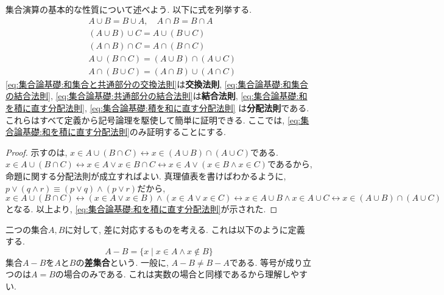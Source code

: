         集合演算の基本的な性質について述べよう. 以下に式を列挙する.
        \begin{align}
            &A\cup B = B \cup A, \quad A \cap B = B \cap A \label{eq:集合論基礎:和集合と共通部分の交換法則}\\
            &(A\cup B)\cup C = A\cup (B \cup C) \label{eq:集合論基礎:和集合の結合法則}\\
            &(A\cap B)\cap C = A\cap (B \cap C) \label{eq:集合論基礎:共通部分の結合法則}\\
            &A\cup (B \cap C) = (A\cup B) \cap (A\cup C)\label{eq:集合論基礎:和を積に直す分配法則}\\
            &A\cap (B \cup C) = (A\cap B) \cup (A\cap C)\label{eq:集合論基礎:積を和に直す分配法則}
        \end{align}
        \eqref{eq:集合論基礎:和集合と共通部分の交換法則}は\textbf{交換法則}, \eqref{eq:集合論基礎:和集合の結合法則}, \eqref{eq:集合論基礎:共通部分の結合法則}は\textbf{結合法則}, \eqref{eq:集合論基礎:和を積に直す分配法則}, \eqref{eq:集合論基礎:積を和に直す分配法則}
        は\textbf{分配法則}である. これらはすべて定義から記号論理を駆使して簡単に証明できる. ここでは, \eqref{eq:集合論基礎:和を積に直す分配法則}のみ証明することにする.
        \begin{proof}
            示すのは, $x\in A\cup (B \cap C) \leftrightarrow x\in (A\cup B) \cap (A\cup C)$である.
            $x\in A\cup (B \cap C) \leftrightarrow x\in A \lor x\in B\cap C \leftrightarrow x\in A \lor (x\in B \land x\in C)$であるから, 命題に関する分配法則が成立すればよい.
            真理値表を書けばわかるように, $p\lor (q\land r)\equiv (p\lor q) \land (p\lor r)$だから, $x\in A\cup (B \cap C) \leftrightarrow (x\in A\lor x\in B)\land (x\in A\lor x\in C)\leftrightarrow x\in A\cup B\land x\in A\cup C\leftrightarrow x\in (A\cup B)\cap (A\cup C)$
            となる. 以上より, \eqref{eq:集合論基礎:和を積に直す分配法則}が示された.
        \end{proof}

        二つの集合$A,B$に対して, 差に対応するものを考える. これは以下のように定義する.
        \begin{equation}
            A-B = \{x\mid x\in A \land x\not\in B\} \label{eq:集合論基礎:差集合の定義}
        \end{equation}
        集合$A-B$を$A$と$B$の\textbf{差集合}という. 一般に, $A-B\neq B-A$である. 等号が成り立つのは$A=B$の場合のみである. これは実数の場合と同様であるから理解しやすい.\\

